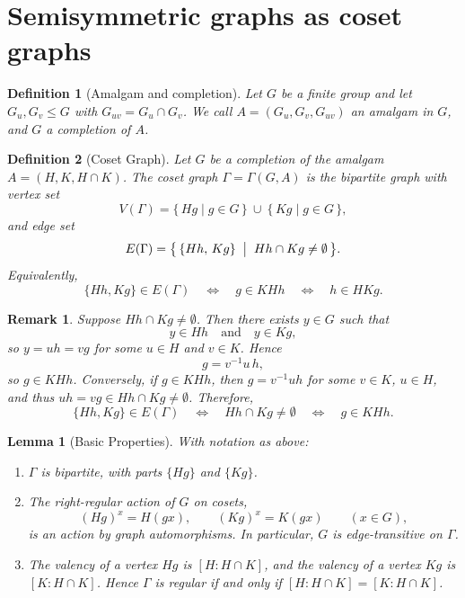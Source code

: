 \documentclass[12pt,a4paper,openany]{book}
\newtheorem{definition}{Definition}[section]
\newtheorem{lemma}{Lemma}[section]
\newtheorem{remark}[theorem]{Remark}
\begin{document}
\section{Semisymmetric graphs as coset graphs}

\begin{definition}[Amalgam and completion]
Let $G$ be a finite group and let $G_u,G_v\le G$ with $G_{uv}=G_u\cap G_v$.
We call $A=(G_u,G_v,G_{uv})$ an \emph{amalgam in $G$}, and $G$ a
\emph{completion} of $A$.
\end{definition}


\begin{definition}[Coset Graph]
Let $G$ be a completion of the amalgam $A = (H, K, H \cap K)$. 
The \emph{coset graph} $\Gamma = \Gamma(G, A)$ is the bipartite graph with vertex set
\[
V(\Gamma) = \{\, H g \mid g \in G \,\} \ \cup\ \{\, K g \mid g \in G \,\},
\]
and edge set
\[
E(\Gamma) = \bigl\{\, \{H h,\, K g\} \;\bigm|\; H h \cap K g \neq \emptyset \,\bigr\}.
\]
Equivalently,
\[
\{H h, K g\} \in E(\Gamma)
\quad \Longleftrightarrow \quad
g \in K H h
\quad \Longleftrightarrow \quad
h \in H K g.
\]
\end{definition}

\begin{remark}
Suppose $Hh \cap Kg \neq \emptyset$. Then there exists $y \in G$ such that 
\[
y \in Hh \quad \text{and} \quad y \in Kg,
\]
so $y = u h = v g$ for some $u \in H$ and $v \in K$. Hence
\[
g = v^{-1} u\, h,
\]
so $g \in K H h$. Conversely, if $g \in K H h$, then $g = v^{-1} u h$ for some 
$v \in K$, $u \in H$, and thus $u h = v g \in Hh \cap Kg \neq \emptyset$. 
Therefore,
\[
\{H h, K g\} \in E(\Gamma)
\quad \Longleftrightarrow \quad
Hh \cap Kg \neq \emptyset
\quad \Longleftrightarrow \quad
g \in K H h.
\]
\end{remark}

\begin{lemma}[Basic Properties]
With notation as above:
\begin{enumerate}
\item $\Gamma$ is bipartite, with parts $\{H g\}$ and $\{K g\}$.
\item The right-regular action of $G$ on cosets,
\[
(H g)^x = H (g x), \qquad (K g)^x = K (g x) \qquad (x \in G),
\]
is an action by graph automorphisms. In particular, $G$ is edge-transitive on $\Gamma$.
\item The valency of a vertex $H g$ is $[H : H \cap K]$, and the valency of a vertex
$K g$ is $[K : H \cap K]$. Hence $\Gamma$ is regular if and only if 
$[H : H \cap K] = [K : H \cap K]$.
\end{enumerate}
\end{lemma}
\end{document}
